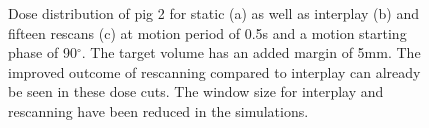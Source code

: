 \documentclass[type=dr, dr=rernat, accentcolor=tud7b,colorbacktitle, bigchapter, openright, twoside, 12pt ]{tudthesis}
\begin{document}
\begin{figure}[H]
\begin{center}
{ }
\caption{Dose distribution of pig 2 for static (a) as well as interplay (b) and fifteen rescans (c) at motion period of 0.5s and a motion 
starting phase of 90$^{\circ}$. The target volume has an added margin of 5mm. The improved outcome of rescanning compared to interplay 
can already be seen in these dose cuts. The window size for interplay and rescanning have been reduced in the simulations.}
\label{dose_pig2}
 \end{center}
\end{figure}

\newpage
\end{document}
